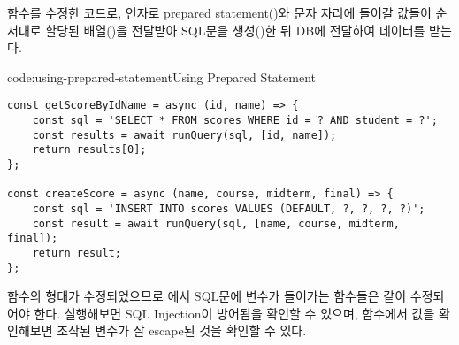 \는  함수를 수정한 코드로, 인자로 prepared statement()와  문자 자리에 들어갈 값들이 순서대로 할당된 배열()을 전달받아 SQL문을 생성()한 뒤 DB에 전달하여 데이터를 받는다.

\begin{codeenv}{code:using-prepared-statement}{Using Prepared Statement}\begin{verbatim}
const getScoreByIdName = async (id, name) => {
    const sql = 'SELECT * FROM scores WHERE id = ? AND student = ?';
    const results = await runQuery(sql, [id, name]);
    return results[0];
};

const createScore = async (name, course, midterm, final) => {
    const sql = 'INSERT INTO scores VALUES (DEFAULT, ?, ?, ?, ?)';
    const result = await runQuery(sql, [name, course, midterm, final]);
    return result;
};
\end{verbatim}
\end{codeenv}

 함수의 형태가 수정되었으므로 에서 SQL문에 변수가 들어가는 함수들은 \와 같이 수정되어야 한다. \과 \을 실행해보면 SQL Injection이 방어됨을 확인할 수 있으며,  함수에서  값을 확인해보면 조작된 변수가 잘 escape된 것을 확인할 수 있다.

